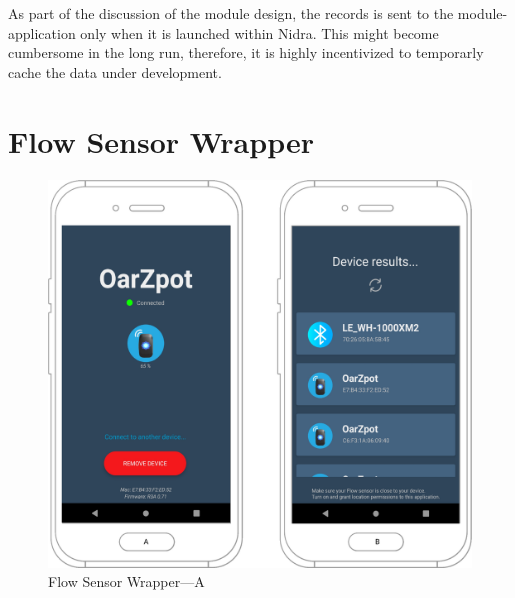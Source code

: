 As part of the discussion of the module design, the records is sent to the module-application only when it is launched within Nidra. This might become cumbersome in the long run, therefore, it is highly incentivized to temporarly cache the data under development. 


\chapter{Flow Sensor Wrapper}

\begin{figure}
    \centering
    \includegraphics[scale=0.35]{images/flow_app.pdf}
    \caption{Flow Sensor Wrapper---A}
    \label{fig:flowapp}
\end{figure}